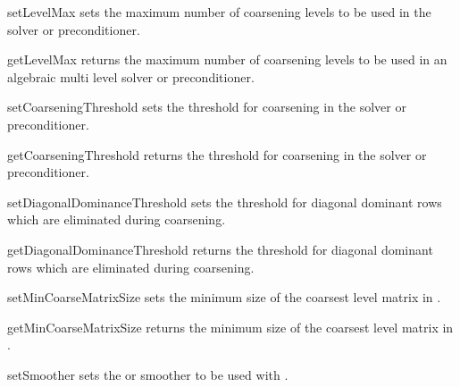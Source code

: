 \begin{methoddesc}[SolverOptions]{setLevelMax}{}
sets the maximum number of coarsening levels to be used in the \AMG solver or
preconditioner.
\end{methoddesc}

\begin{methoddesc}[SolverOptions]{getLevelMax}{}
returns the maximum number of coarsening levels to be used in an algebraic
multi level solver or preconditioner.
\end{methoddesc}

\begin{methoddesc}[SolverOptions]{setCoarseningThreshold}{}
sets the threshold for coarsening in the \AMG solver or preconditioner.
\end{methoddesc}

\begin{methoddesc}[SolverOptions]{getCoarseningThreshold}{}
returns the threshold for coarsening in the \AMG solver or preconditioner.
\end{methoddesc}

\begin{methoddesc}[SolverOptions]{setDiagonalDominanceThreshold}{}
sets the threshold for diagonal dominant rows which are eliminated during \AMG  coarsening.
\end{methoddesc}

\begin{methoddesc}[SolverOptions]{getDiagonalDominanceThreshold}{}
returns the threshold for diagonal dominant rows which are eliminated during \AMG  coarsening.
\end{methoddesc}

\begin{methoddesc}[SolverOptions]{setMinCoarseMatrixSize}{}
sets the minimum size of the coarsest level matrix in \AMG.
\end{methoddesc}

\begin{methoddesc}[SolverOptions]{getMinCoarseMatrixSize}{}
returns the minimum size of the coarsest level matrix in \AMG.
\end{methoddesc}

\begin{methoddesc}[SolverOptions]{setSmoother}{}
sets the \JACOBI or \GAUSSSEIDEL smoother to be used with \AMG.
\end{methoddesc}

